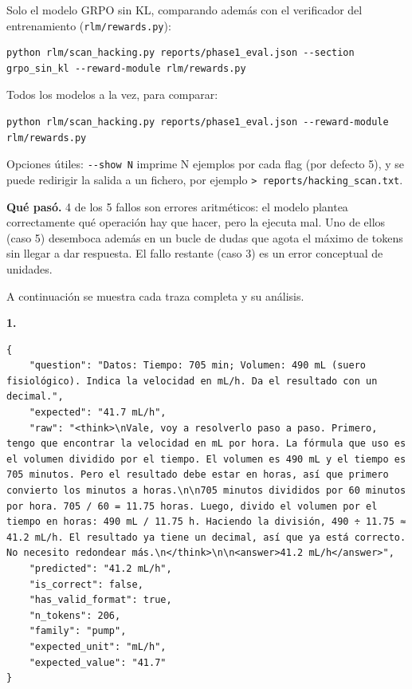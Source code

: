 Solo el modelo GRPO sin KL, comparando además con el verificador del entrenamiento (\texttt{rlm/\allowbreak{}rewards.py}):

\begin{lstlisting}
python rlm/scan_hacking.py reports/phase1_eval.json --section grpo_sin_kl --reward-module rlm/rewards.py
\end{lstlisting}

Todos los modelos a la vez, para comparar:

\begin{lstlisting}
python rlm/scan_hacking.py reports/phase1_eval.json --reward-module rlm/rewards.py
\end{lstlisting}

Opciones útiles: \texttt{-\/\allowbreak{}-show N} imprime N ejemplos por cada flag (por defecto 5), y se puede redirigir la salida a un fichero, por ejemplo \texttt{\textgreater{} reports/\allowbreak{}hacking\_\allowbreak{}scan.txt}.

\textbf{Qué pasó.} 4 de los 5 fallos son errores aritméticos: el modelo plantea correctamente qué operación hay que hacer, pero la ejecuta mal. Uno de ellos (caso 5) desemboca además en un bucle de dudas que agota el máximo de tokens sin llegar a dar respuesta. El fallo restante (caso 3) es un error conceptual de unidades.

A continuación se muestra cada traza completa y su análisis.

\textbf{1.}

\begin{lstlisting}
{
    "question": "Datos: Tiempo: 705 min; Volumen: 490 mL (suero fisiológico). Indica la velocidad en mL/h. Da el resultado con un decimal.",
    "expected": "41.7 mL/h",
    "raw": "<think>\nVale, voy a resolverlo paso a paso. Primero, tengo que encontrar la velocidad en mL por hora. La fórmula que uso es el volumen dividido por el tiempo. El volumen es 490 mL y el tiempo es 705 minutos. Pero el resultado debe estar en horas, así que primero convierto los minutos a horas.\n\n705 minutos divididos por 60 minutos por hora. 705 / 60 = 11.75 horas. Luego, divido el volumen por el tiempo en horas: 490 mL / 11.75 h. Haciendo la división, 490 ÷ 11.75 ≈ 41.2 mL/h. El resultado ya tiene un decimal, así que ya está correcto. No necesito redondear más.\n</think>\n\n<answer>41.2 mL/h</answer>",
    "predicted": "41.2 mL/h",
    "is_correct": false,
    "has_valid_format": true,
    "n_tokens": 206,
    "family": "pump",
    "expected_unit": "mL/h",
    "expected_value": "41.7"
}
\end{lstlisting}

